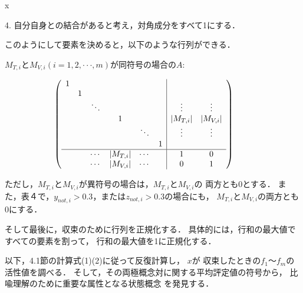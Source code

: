 \begin{namelist}{x}
 \item[\hspace{0.3cm}4.] 自分自身との結合があると考え，対角成分をすべて1にする．
\end{namelist}

\noindent このようにして要素を決めると，以下のような行列ができる．


\vspace{0.2cm}

\newcommand{\bigzerol}{}
\newcommand{\bigzerou}{}
\hspace{2cm}
$M_{T,i}$と$M_{V,i}$\hspace{0.1cm}$(i=1,2,\cdot\cdot\cdot,m)$が同符号の場合の$A$: 


\[ \hspace{-0.8cm}\left(
\begin{array}{cccccc|cc}
1 &   &        &        &        &\bigzerou &   &   \\
& 1 &        &        &        &          &    &    \\
&   & \ddots &        &        &          & \vdots  & \vdots   \\
&   &    &  1 &   &  & \left|M_{T,i}\right| & \left|M_{V,i}\right| \\
&   &        &        & \ddots &  & \vdots & \vdots \\
\bigzerol&   &        &        &        & 1 &  &  \\
\hline
&   &  \cdots      & \left|M_{T,i}\right| & \cdots &  & 1 & 0 \\
&   &  \cdots      & \left|M_{V,i}\right| & \cdots &  & 0 & 1 
\end{array}
\right) \]

\vspace{0.2cm}

\noindent ただし，$M_{T,i}$と$M_{V,i}$が異符号の場合は，$M_{T,i}$と$M_{V,i}$の
両方とも$0$とする．
また，表４で，$y_{not,i}>0.3$，または$z_{not,i}>0.3$の場合にも，
$M_{T,i}$と$M_{V,i}$の両方とも$0$にする．

そして最後に，収束のために行列を正規化する．
具体的には，行和の最大値ですべての要素を割って，
行和の最大値を1に正規化する．

以下，4.1節の計算式(1)(2)に従って反復計算し，
\mbox{\boldmath$x$}\hspace{0.1cm}が
収束したときの$f_1$〜$f_m$の\mbox{活性値を調}べる．
そして，その両極概念対に関する平均評定値の符号から，
比喩理解のために重要な属性となる状態概念
を発見する．


